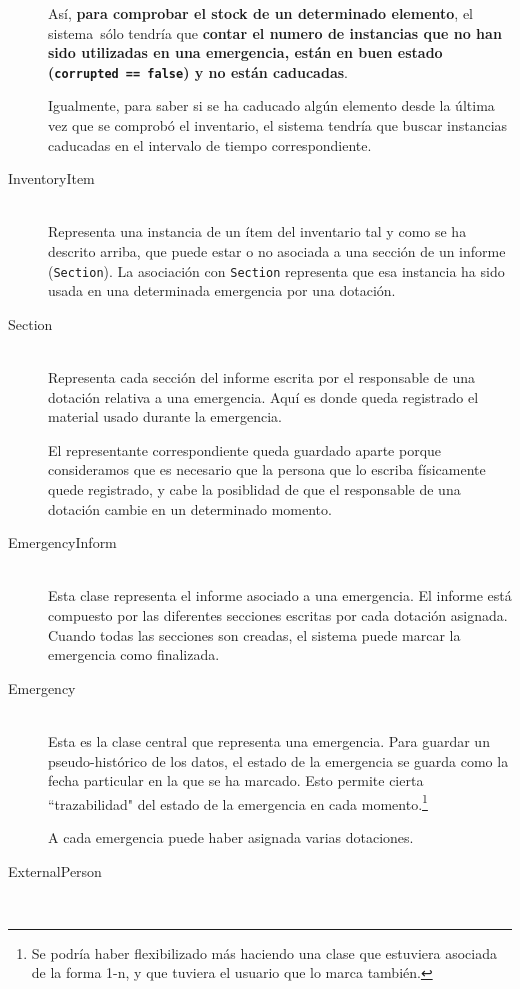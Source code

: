 \begin{description}
        Así, \textbf{para comprobar el stock de un determinado elemento}, el sistema sólo tendría que \textbf{contar el numero de instancias que no han sido utilizadas en una emergencia, están en buen estado (\texttt{corrupted == false}) y no están caducadas}. \par
        Igualmente, para saber si se ha caducado algún elemento desde la última vez que se comprobó el inventario, el sistema tendría que buscar instancias caducadas en el intervalo de tiempo correspondiente.
    \item[InventoryItem] \hfill \\
        Representa una instancia de un ítem del inventario tal y como se ha descrito arriba, que puede estar o no asociada a una sección de un informe (\texttt{Section}).
        La asociación con \texttt{Section} representa que esa instancia ha sido usada en una determinada emergencia por una dotación.
    \item[Section] \hfill \\
        Representa cada sección del informe escrita por el responsable de una dotación relativa a una emergencia. Aquí es donde queda registrado el material usado durante la emergencia. \par
        El representante correspondiente queda guardado aparte porque consideramos que es necesario que la persona que lo escriba físicamente quede registrado, y cabe la posiblidad de que el responsable de una dotación cambie en un determinado momento.
    \item[EmergencyInform] \hfill \\
        Esta clase representa el informe asociado a una emergencia. El informe está compuesto por las diferentes secciones escritas por cada dotación asignada. Cuando todas las secciones son creadas, el sistema puede marcar la emergencia como finalizada.
    \item[Emergency] \hfill \\
        Esta es la clase central que representa una emergencia. Para guardar un pseudo-histórico de los datos, el estado de la emergencia se guarda como la fecha particular en la que se ha marcado. Esto permite cierta ``trazabilidad" del estado de la emergencia en cada momento.\footnote{Se podría haber flexibilizado más haciendo una clase que estuviera asociada de la forma 1-n, y que tuviera el usuario que lo marca también.} \par
        A cada emergencia puede haber asignada varias dotaciones.
    \item[ExternalPerson] \hfill \\

\end{description}
